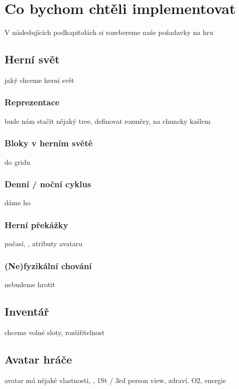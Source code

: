 


\section{Co bychom chtěli implementovat}

V následujících podkapitolách si rozebereme naše požadavky na hru








\subsection{Herní svět}

jaký chceme herní svět

\subsubsection{Reprezentace}

bude nám stačit nějaký tree, definovat rozměry, na chuncky kašlem

\subsubsection{Bloky v herním světě}

do gridu

\subsubsection{Denní / noční cyklus}
dáme ho

\subsubsection{Herní překážky}

počasí, , atributy avataru

\subsubsection{(Ne)fyzikální chování}

nebudeme hrotit

\subsection{Inventář}

chceme volné sloty, rozšiřitelnost

\subsection{Avatar hráče}
avatar má nějaké vlastnosti, \HUD{}, 1St / 3rd person view, zdraví, O2, energie




